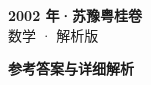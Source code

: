 \documentclass[zihao=-4, a4paper]{ctexart}
\begin{document}
\begin{center}
  {\Large\bfseries 2002 年·苏豫粤桂卷}\\[4pt]
  {\large 数学 · 解析版}
\end{center}
\medskip
{}

\clearpage
{}
\begin{center}{\Large\bfseries 参考答案与详细解析}\end{center}
\medskip

\end{document}
